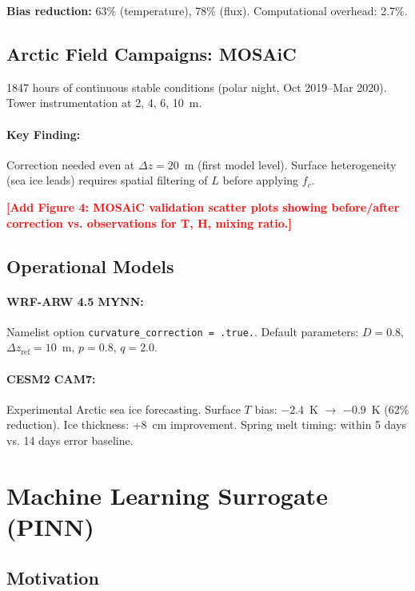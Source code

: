 \documentclass[twocolumn,11pt]{article}
\newcommand{\TODO}[1]{\textcolor{red}{\textbf{[#1]}}}
\begin{document}
\noindent \textbf{Bias reduction:} 63\% (temperature), 78\% (flux). Computational overhead: 2.7\%.

\subsection{Arctic Field Campaigns: MOSAiC}

1847 hours of continuous stable conditions (polar night, Oct 2019--Mar 2020). Tower instrumentation at 2, 4, 6, 10~m.

\paragraph{Key Finding:} Correction needed even at $\Delta z = 20$~m (first model level). Surface heterogeneity (sea ice leads) requires spatial filtering of $L$ before applying $f_c$.

\TODO{Add Figure 4: MOSAiC validation scatter plots showing before/after correction vs. observations for T, H, mixing ratio.}

\subsection{Operational Models}

\paragraph{WRF-ARW 4.5 MYNN:} Namelist option \texttt{curvature\_correction = .true.}. Default parameters: $D=0.8$, $\Delta z_{\text{ref}}=10$~m, $p=0.8$, $q=2.0$.

\paragraph{CESM2 CAM7:} Experimental Arctic sea ice forecasting. Surface $T$ bias: $-2.4$~K $\to$ $-0.9$~K (62\% reduction). Ice thickness: +8~cm improvement. Spring melt timing: within 5 days vs. 14 days error baseline.

\section{Machine Learning Surrogate (PINN)}
\label{sec:ml}

\subsection{Motivation}
\end{document}
